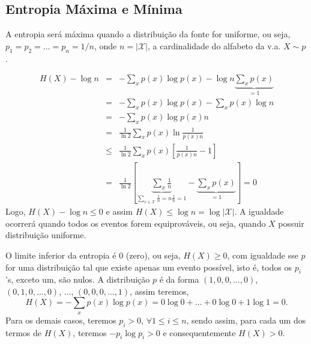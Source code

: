 \subsection{Entropia Máxima e Mínima}
\begin{questions}

\begin{solution}

A entropia será máxima quando a distribuição da fonte for uniforme, ou seja, $p_1 = p_2 = \ldots = p_n = 1/n$,
onde $n = \vert \mathcal{X} \vert$, a cardinalidade do alfabeto da v.a. $X \sim p$.

\begin{eqnarray}
    H(X) - \log n &=& - \sum_x p(x) \log p(x)  - \log n \underbrace{\sum_x p(x)}_{=1} \nonumber \\
        &=& - \sum_x p(x) \log p(x) - \sum_x p(x) \log n \nonumber \\
        &=& - \sum_x p(x) \log p(x) n \nonumber \\
        &=& \frac{1}{\ln 2} \sum_x p(x) \ln \frac{1}{p(x) n} \nonumber \\
        &\leq& \frac{1}{\ln 2} \sum_x p(x) \left[ \frac{1}{p(x) n} -1 \right] \nonumber \\
        &=& \frac{1}{\ln 2} \left[ \underbrace{\sum_x \frac{1}{n}}_{\sum_{x \in \mathcal{X}} \frac{1}{n} = n \frac{1}{n} = 1} - \underbrace{\sum_x p(x)}_{=1} \right] = 0
\end{eqnarray}
Logo, $H(X) - \log n \leq 0$ e assim $H(X) \leq \log n = \log \vert \mathcal{X} \vert$.
A igualdade ocorrerá quando todos os eventos forem equiprováveis, ou seja, quando $X$ possuir distribuição uniforme.

O limite inferior da entropia é $0$ (zero), ou seja, $H(X) \geq 0$, com igualdade sse $p$ for uma distribuição
tal que existe apenas um evento possível, isto é, todos os $p_i$'s, exceto um, são nulos.
A distribuição $p$ é da forma $(1, 0, 0, \ldots, 0)$, $(0, 1, 0, \ldots, 0)$, $\ldots$, $(0, 0, 0, \ldots, 1)$,
assim teremos, 
\begin{equation}
 H(X) =  - \sum_x p(x) \log p(x) = 0 \log 0 + \ldots + 0 \log 0 + 1 \log 1 = 0 .
\end{equation}
Para os demais casos, teremos $p_i > 0$, $\forall 1 \leq i \leq n$, sendo assim, para cada um dos termos
de $H(X)$, teremos $-p_i \log p_i > 0$ e consequentemente $H(X) > 0$.


\end{solution}
\end{questions}
